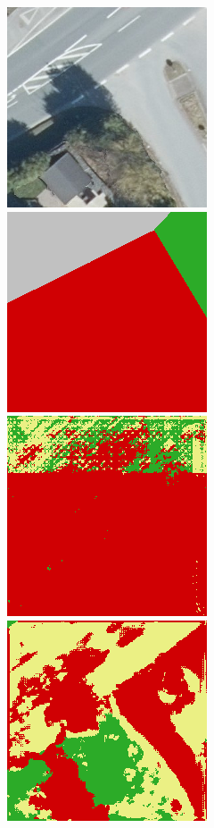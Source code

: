 \begin{figure}
    \vspace{3mm}
    \includegraphics[width=\DensenetPredictionsImageWidth]{images/densenet/291991-image} \hfill
    \includegraphics[width=\DensenetPredictionsImageWidth]{images/densenet/291991-label} \hfill
    \includegraphics[width=\DensenetPredictionsImageWidth]{images/densenet/densenet-103D/291991-prediction} \hfill
    \includegraphics[width=\DensenetPredictionsImageWidth]{images/densenet/densenet-103CD/291991-prediction} \hfill

\end{figure}
